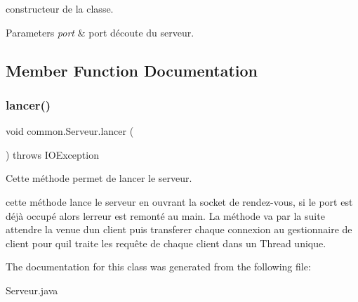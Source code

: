 constructeur de la classe. 


\begin{DoxyParams}{Parameters}
{\em port} & port d\textquotesingle{}écoute du serveur. \\
\hline
\end{DoxyParams}


\subsection{Member Function Documentation}
\mbox{\label{classcommon_1_1Serveur_a9924019a4577e360dafa9ab6df2d4ffd}} 
\subsubsection{\texorpdfstring{lancer()}{lancer()}}
{\footnotesize\ttfamily void common.\+Serveur.\+lancer (\begin{DoxyParamCaption}{ }\end{DoxyParamCaption}) throws I\+O\+Exception\hspace{0.3cm}{\ttfamily [inline]}}



Cette méthode permet de lancer le serveur. 

cette méthode lance le serveur en ouvrant la socket de rendez-\/vous, si le port est déjà occupé alors l\textquotesingle{}erreur est remonté au main. La méthode va par la suite attendre la venue d\textquotesingle{}un client puis transferer chaque connexion au gestionnaire de client pour qu\textquotesingle{}il traite les requête de chaque client dans un Thread unique. 

The documentation for this class was generated from the following file\+:\begin{DoxyCompactItemize}
\item 
Serveur.\+java\end{DoxyCompactItemize}
